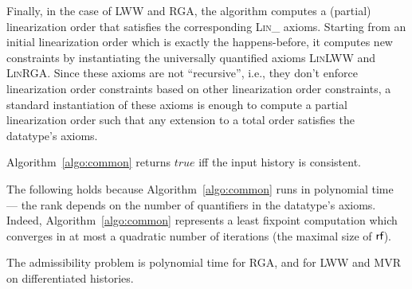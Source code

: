 Finally, in the case of LWW and RGA, the algorithm computes a (partial) linearization order that satisfies the corresponding \textsc{Lin\_} axioms. Starting from an initial linearization order which is exactly the happens-before, it computes new constraints by instantiating the universally quantified axioms \textsc{LinLWW} and \textsc{LinRGA}. Since these axioms are not ``recursive'', i.e., they don't enforce linearization order constraints based on other linearization order constraints, a standard instantiation of these axioms is enough to compute a partial linearization order such that any extension to a total order satisfies the datatype's axioms.

\vspace{-1.5mm}
\begin{theorem}

  Algorithm~\ref{algo:common} returns $\mathit{true}$ iff the input history is consistent.

\vspace{-1.5mm}
\end{theorem}

The following holds because Algorithm~\ref{algo:common} runs in polynomial time — the rank depends on the number of quantifiers in the datatype's axioms. Indeed, Algorithm~\ref{algo:common} represents a least fixpoint computation which converges in at most a quadratic number of iterations (the maximal size of $\textsf{rf}$).

\vspace{-1.5mm}
\begin{corollary}

  The admissibility problem is polynomial time for RGA, and for LWW and MVR on differentiated histories.

\vspace{-1.5mm}
\end{corollary}

